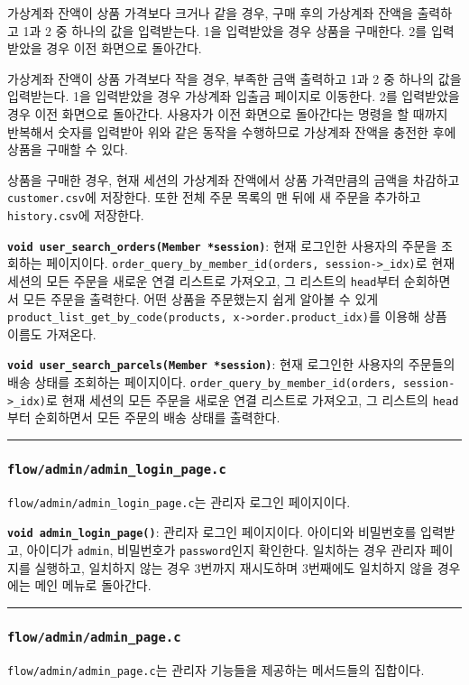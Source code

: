 \documentclass[runningheads]{llncs}
\begin{document}
가상계좌 잔액이 상품 가격보다 크거나 같을 경우, 구매 후의 가상계좌 잔액을 출력하고 1과 2 중 하나의 값을 입력받는다. 1을 입력받았을 경우 상품을 구매한다. 2를 입력받았을 경우 이전 화면으로 돌아간다.

가상계좌 잔액이 상품 가격보다 작을 경우, 부족한 금액 출력하고 1과 2 중 하나의 값을 입력받는다. 1을 입력받았을 경우 가상계좌 입출금 페이지로 이동한다. 2를 입력받았을 경우 이전 화면으로 돌아간다. 사용자가 이전 화면으로 돌아간다는 명령을 할 때까지 반복해서 숫자를 입력받아 위와 같은 동작을 수행하므로 가상계좌 잔액을 충전한 후에 상품을 구매할 수 있다.

상품을 구매한 경우, 현재 세션의 가상계좌 잔액에서 상품 가격만큼의 금액을 차감하고 \texttt{customer.csv}에 저장한다. 또한 전체 주문 목록의 맨 뒤에 새 주문을 추가하고 \texttt{history.csv}에 저장한다. 

\textbf{\texttt{void user_search_orders(Member *session)}}: 현재 로그인한 사용자의 주문을 조회하는 페이지이다. \texttt{order_query_by_member_id(orders, session->_idx)}로 현재 세션의 모든 주문을 새로운 연결 리스트로 가져오고, 그 리스트의 \texttt{head}부터 순회하면서 모든 주문을 출력한다. 어떤 상품을 주문했는지 쉽게 알아볼 수 있게 \texttt{product_list_get_by_code(products, x->order.product_idx)}를 이용해 상픔 이름도 가져온다.

\textbf{\texttt{void user_search_parcels(Member *session)}}: 현재 로그인한 사용자의 주문들의 배송 상태를 조회하는 페이지이다. \texttt{order_query_by_member_id(orders, session->_idx)}로 현재 세션의 모든 주문을 새로운 연결 리스트로 가져오고, 그 리스트의 \texttt{head}부터 순회하면서 모든 주문의 배송 상태를 출력한다.

\noindent\rule{2cm}{0.4pt}

\subsubsection{\texttt{flow/admin/admin_login_page.c}}
\texttt{flow/admin/admin_login_page.c}는 관리자 로그인 페이지이다.

\textbf{\texttt{void admin_login_page()}}: 관리자 로그인 페이지이다. 아이디와 비밀번호를 입력받고, 아이디가 \texttt{admin}, 비밀번호가 \texttt{password}인지 확인한다. 일치하는 경우 관리자 페이지를 실행하고, 일치하지 않는 경우 3번까지 재시도하며 3번째에도 일치하지 않을 경우에는 메인 메뉴로 돌아간다.

\noindent\rule{2cm}{0.4pt}

\subsubsection{\texttt{flow/admin/admin_page.c}}
\texttt{flow/admin/admin_page.c}는 관리자 기능들을 제공하는 메서드들의 집합이다.
\end{document}
